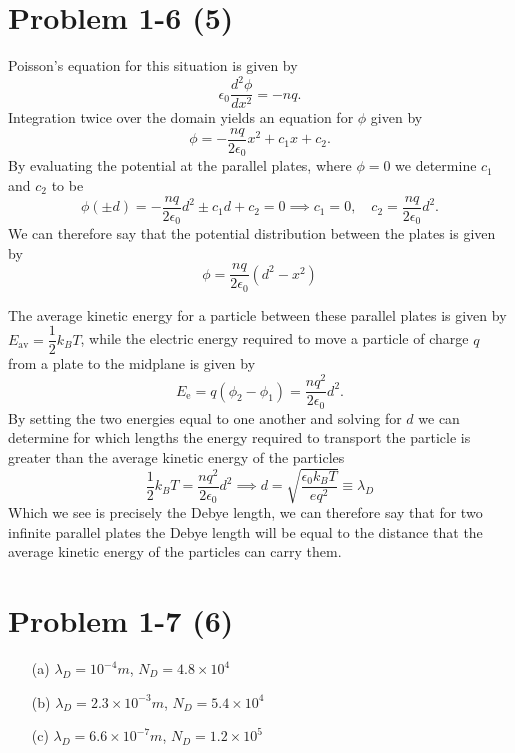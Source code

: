\section*{Problem 1-6 (5)}
\label{sec:1-6}
Poisson's equation for this situation is given by
\begin{equation}
	\epsilon_0\dfrac{d^2\phi}{dx^2} = -nq.
\end{equation}
Integration twice over the domain yields an equation for \(\phi \) given by
\begin{equation}
	\phi = -\dfrac{nq}{2\epsilon_0}x^2 + c_1x + c_2.
\end{equation}
By evaluating the potential at the parallel plates, where \(\phi=0\) we determine \(c_1\) and \(c_2\) to be
\begin{equation}
	\phi(\pm d) = -\dfrac{nq}{2\epsilon_0}d^2 \pm c_1d + c_2 = 0 \implies
	c_1 = 0, \quad c_2 = \dfrac{nq}{2\epsilon_0}d^2.
\end{equation}
We can therefore say that the potential distribution between the plates is given by
\begin{equation}
	\phi = \dfrac{nq}{2\epsilon_0}\left(d^2 - x^2\right)
\end{equation}

The average kinetic energy for a particle between these parallel plates is given by \(E_\text{av} = \dfrac{1}{2}k_BT\), while the electric energy required to move a particle of charge \(q\) from a plate to the midplane is given by
\begin{equation}
	E_\text{e} = q\left(\phi_2 - \phi_1\right) = \dfrac{nq^2}{2\epsilon_0}d^2.
\end{equation}
By setting the two energies equal to one another and solving for \(d\) we can determine for which lengths the energy required to transport the particle is greater than the average kinetic energy of the particles
\begin{equation}
	\dfrac{1}{2}k_BT = \dfrac{nq^2}{2\epsilon_0}d^2 \implies d = \sqrt{\dfrac{\epsilon_0k_BT}{eq^2}} \equiv \lambda_D
\end{equation}
Which we see is precisely the Debye length, we can therefore say that for two infinite parallel plates the Debye length will be equal to the distance that the average kinetic energy of the particles can carry them. 

\section*{Problem 1-7 (6)}
\label{sec:1-7}
\begin{itemize}
	\item[(a)] \(\lambda_D = 10^{-4}m \), \(N_D = 4.8\times10^4 \)
	\item[(b)] \(\lambda_D = 2.3\times10^{-3}m \), \(N_D = 5.4\times10^{4}\)
	\item[(c)] \(\lambda_D = 6.6\times10^{-7}m \), \(N_D = 1.2\times10^5\)
\end{itemize}

